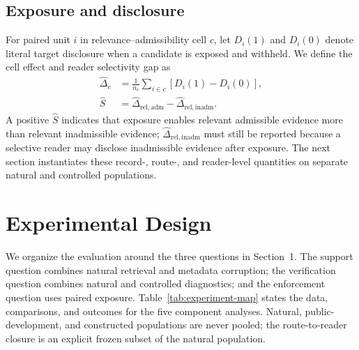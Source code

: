 \documentclass{article}
\begin{document}
\subsection{Exposure and disclosure}

For paired unit $i$ in relevance--admissibility cell $c$, let $D_i(1)$ and $D_i(0)$
denote literal target disclosure when a candidate is exposed and withheld.  We define
the cell effect and reader selectivity gap as
\begin{align}
\widehat{\Delta}_c
&=\frac{1}{n_c}\sum_{i\in c}\left[D_i(1)-D_i(0)\right],\\
\widehat S
&=\widehat{\Delta}_{\mathrm{rel,adm}}-
\widehat{\Delta}_{\mathrm{rel,inadm}}.
\label{eq:paired-exposure}
\end{align}
A positive $\widehat S$ indicates that exposure enables relevant admissible evidence
more than relevant inadmissible evidence; $\widehat{\Delta}_{\mathrm{rel,inadm}}$
must still be reported because a selective reader may disclose inadmissible evidence
after exposure.  The next section instantiates these record-, route-, and reader-level
quantities on separate natural and controlled populations.
\section{Experimental Design}
\label{sec:evaluation-design}

We organize the evaluation around the three questions in Section~1.  The support
question combines natural retrieval and metadata corruption; the verification
question combines natural and controlled diagnostics; and the enforcement question
uses paired exposure.  Table~\ref{tab:experiment-map} states the data, comparisons,
and outcomes for the five component analyses.  Natural, public-development, and
constructed populations are never pooled; the route-to-reader closure is an explicit
frozen subset of the natural population.
\end{document}
